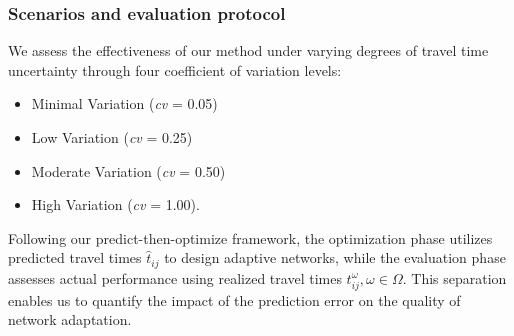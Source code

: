 \documentclass[a4paper,fleqn]{cas-sc}
\begin{document}
\subsubsection{Scenarios and evaluation protocol}

We assess the effectiveness of our method under varying degrees of travel time uncertainty through four coefficient of variation levels: 
\begin{itemize}
    \item Minimal Variation (\textit{cv} = 0.05)
    \item Low Variation (\textit{cv} = 0.25)
    \item Moderate Variation (\textit{cv} = 0.50)
    \item High Variation (\textit{cv} = 1.00).
\end{itemize}
%
Following our predict-then-optimize framework, the optimization phase utilizes predicted travel times $\hat{t}_{ij}$ to design adaptive networks, while the evaluation phase assesses actual performance using realized travel times $t_{ij}^\omega,\omega\in\Omega$. This separation enables us to quantify the impact of the prediction error on the quality of network adaptation.
\end{document}
